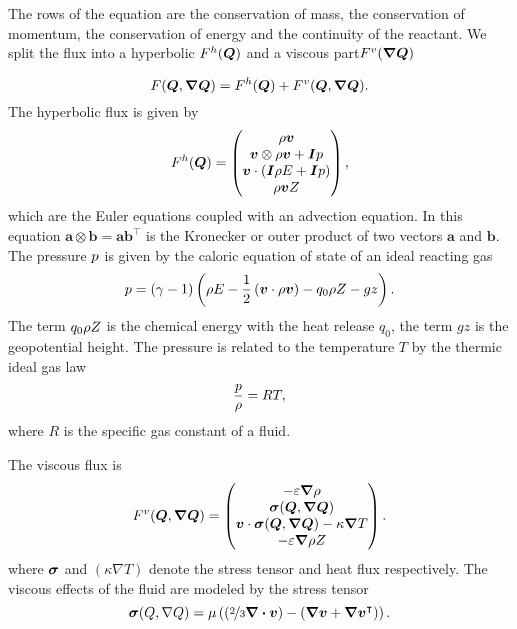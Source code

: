 The rows of the equation are the conservation of mass, the conservation of momentum, the conservation of energy and the continuity of the reactant.
We split the flux into a hyperbolic $F^{h}(\bm{Q})$ and a viscous part$\viscFlux(\gradQ)$

\begin{equation}
  \label{eq:flux}
  \flux(\Q, \gradQ) = \hyperFlux(\Q) + \viscFlux(\Q, \gradQ).
\end{equation}
The hyperbolic flux is given by
\begin{equation}
  \label{eq:hyper-flux}
  F^{h}(\bm{Q}) = \begin{pmatrix} \rho \bm{v} \\ \bm{v} \otimes \rho \bm{v} + \bm{I} p \\ \bm{v} \cdot (\bm{I} \rho E + \bm{I} p) \\ \rho \bm{v} Z \end{pmatrix},
\end{equation}
which are the Euler equations coupled with an advection equation.
In this equation $\bm{a} \otimes \bm{b} = \bm{a} \bm{b}^\intercal$ is the Kronecker or outer product of two vectors $\bm{a}$ and $\bm{b}$.
The pressure $p$ is given by the caloric equation of state of an ideal reacting gas
\begin{equation}
  \label{eq:eos}
  p = (\gamma - 1) \left(\rho E - \frac{1}{2} \left(\bm{v} \cdot \rho \bm{v} \right)  - q_0 \rho Z - gz \right).
\end{equation}
The term $q_0 \rho Z$ is the chemical energy with the heat release $q_0$, the term $gz$ is the geopotential height.
The pressure is related to the temperature $T$ by the thermic ideal gas law
\begin{equation}
  \label{eq:temperature}
 \frac{p}{\rho} = RT,
\end{equation}
where $R$ is the specific gas constant of a fluid.

The viscous flux is
\begin{equation}
  \label{eq:visc-flux}
  \viscFlux(\Q, \gradQ) = \viscFluxDef.
\end{equation}
where $\bm{\sigma}$ and $(\kappa \nabla T)$ denote the stress tensor and heat flux respectively.
The viscous effects of the fluid are modeled by the stress tensor
\begin{equation}
  \label{eq:stress-tensor}
  \stressT(Q, \nabla Q) =
  \mu
  \left(
  \left(\nicefrac{2}{3} \divergence{\Qv} \right) -
  \left( \gradient{\Qv} + \gradient{\Qv}^\intercal \right)
  \right).
\end{equation}

